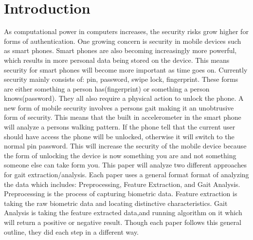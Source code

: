 \documentclass{sig-alternate}
\begin{document}
\section{Introduction}
	As computational power in computers increases, the security risks grow higher for forms of authentication. One growing concern is security in mobile devices such as smart phones. Smart phones are also becoming increasingly more powerful, which results in more personal data being stored on the device. This means security for smart phones will become more important as time goes on. Currently security mainly consists of: pin, password, swipe lock, fingerprint. These forms are either something a person has(fingerprint) or something a person knows(password). They all also require a physical action to unlock the phone. A new form of mobile security involves a persons gait making it an unobtrusive form of security. This means that the built in accelerometer in the smart phone will analyze a persons walking pattern. If the phone tell that the current user should have access the phone will be unlocked, otherwise it will switch to the normal pin password. This will increase the security of the mobile device because the form of unlocking the device is now something you are and not something someone else can take form you. 
	This paper will analyze two different approaches for gait extraction/analysis.  Each paper uses a general format format of analyzing the data which includes: Preprocessing, Feature Extraction, and Gait Analysis. Preprocessing is the process of capturing biometric data. Feature extraction is taking the raw biometric data and locating distinctive characteristics. Gait Analysis is taking the feature extracted data,and running algorithm on it which will return a positive or negative result. Though each paper follows this general outline, they did each step in a different way.


\end{document}
